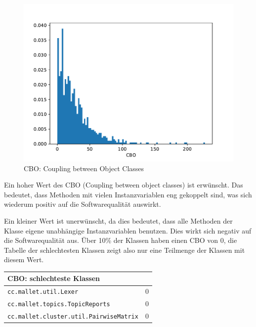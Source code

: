 \documentclass{scrreprt}
\newcommand{\lstx}[1]{\lstinline$#1$}
\begin{document}
\begin{figure}
 \centering
 \includegraphics[width=.8\textwidth]{./CBO.pdf}
 \caption{CBO: Coupling between Object Classes}
 \label{abb:cbo}
\end{figure}

Ein hoher Wert des CBO (Coupling between object classes) ist erwünscht. Das bedeutet, dass Methoden mit vielen Instanzvariablen eng gekoppelt sind, was sich wiederum positiv auf die Softwarequalität auswirkt.




Ein kleiner Wert ist unerwünscht, da dies bedeutet, dass alle Methoden der Klasse eigene unabhängige Instanzvariablen benutzen. Dies wirkt sich negativ auf die Softwarequalität aus. Über 10\% der Klassen haben einen CBO von 0, die Tabelle der schlechtesten Klassen zeigt also nur eine Teilmenge der Klassen mit diesem Wert.



\begin{center}
\begin{tabular}{ll}
\toprule
CBO: schlechteste Klassen\\
\midrule
\lstx{cc.mallet.util.Lexer} & 0\\
\lstx{cc.mallet.topics.TopicReports} & 0\\
\lstx{cc.mallet.cluster.util.PairwiseMatrix} & 0 \\
\bottomrule
\end{tabular}
\end{center}
\end{document}
